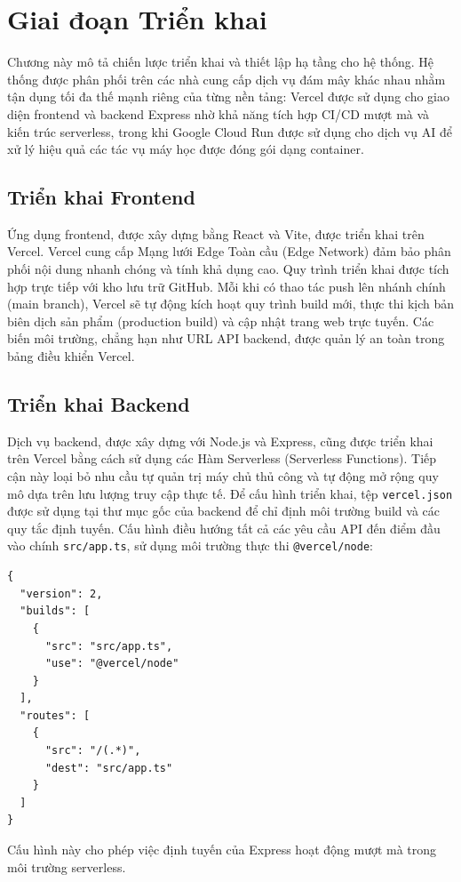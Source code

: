 \section{Giai đoạn Triển khai}

Chương này mô tả chiến lược triển khai và thiết lập hạ tầng cho hệ thống. Hệ thống được phân phối trên các nhà cung cấp dịch vụ đám mây khác nhau nhằm tận dụng tối đa thế mạnh riêng của từng nền tảng: Vercel được sử dụng cho giao diện frontend và backend Express nhờ khả năng tích hợp CI/CD mượt mà và kiến trúc serverless, trong khi Google Cloud Run được sử dụng cho dịch vụ AI để xử lý hiệu quả các tác vụ máy học được đóng gói dạng container.

\subsection{Triển khai Frontend}
Ứng dụng frontend, được xây dựng bằng React và Vite, được triển khai trên Vercel. Vercel cung cấp Mạng lưới Edge Toàn cầu (Edge Network) đảm bảo phân phối nội dung nhanh chóng và tính khả dụng cao. Quy trình triển khai được tích hợp trực tiếp với kho lưu trữ GitHub. Mỗi khi có thao tác push lên nhánh chính (main branch), Vercel sẽ tự động kích hoạt quy trình build mới, thực thi kịch bản biên dịch sản phẩm (production build) và cập nhật trang web trực tuyến. Các biến môi trường, chẳng hạn như URL API backend, được quản lý an toàn trong bảng điều khiển Vercel.

\subsection{Triển khai Backend}
Dịch vụ backend, được xây dựng với Node.js và Express, cũng được triển khai trên Vercel bằng cách sử dụng các Hàm Serverless (Serverless Functions). Tiếp cận này loại bỏ nhu cầu tự quản trị máy chủ thủ công và tự động mở rộng quy mô dựa trên lưu lượng truy cập thực tế.
Để cấu hình triển khai, tệp \texttt{vercel.json} được sử dụng tại thư mục gốc của backend để chỉ định môi trường build và các quy tắc định tuyến. Cấu hình điều hướng tất cả các yêu cầu API đến điểm đầu vào chính \texttt{src/app.ts}, sử dụng môi trường thực thi \texttt{@vercel/node}:

\begin{verbatim}
{
  "version": 2,
  "builds": [
    {
      "src": "src/app.ts",
      "use": "@vercel/node"
    }
  ],
  "routes": [
    {
      "src": "/(.*)",
      "dest": "src/app.ts"
    }
  ]
}
\end{verbatim}
Cấu hình này cho phép việc định tuyến của Express hoạt động mượt mà trong môi trường serverless.

